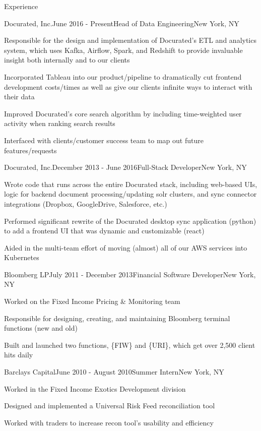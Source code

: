 \documentclass{resume}
\begin{document}
\begin{rSection}{Experience}
  \begin{rSubsection}{Docurated, Inc.}{June 2016 - Present}{Head of Data Engineering}{New York, NY}
  \item Responsible for the design and implementation of Docurated's ETL and analytics system,
    which uses Kafka, Airflow, Spark, and Redshift to provide invaluable 
    insight both internally and to our clients
  \item Incorporated Tableau into our product/pipeline to dramatically cut frontend development costs/times
    as well as give our clients infinite ways to interact with their data 
  \item Improved Docurated's core search algorithm by including time-weighted user activity when ranking search results
  \item Interfaced with clients/customer success team to map out future features/requests
  \end{rSubsection}

  \begin{rSubsection}{Docurated, Inc.}{December 2013 - June 2016}{Full-Stack Developer}{New York, NY}
  \item Wrote code that runs across the entire Docurated stack, including
    web-based UIs, logic for backend document processing/updating solr clusters, and
    sync connector integrations (Dropbox, GoogleDrive, Salesforce, etc.)
  \item Performed significant rewrite of the Docurated desktop sync application (python) 
    to add a frontend UI that was dynamic and customizable (react)
  \item Aided in the multi-team effort of moving (almost) all of our AWS services into Kubernetes
  \end{rSubsection}

  \begin{rSubsection}{Bloomberg LP}{July 2011 - December 2013}{Financial Software Developer}{New York, NY}
  \item Worked on the Fixed Income Pricing \& Monitoring team
  \item Responsible for designing, creating, and maintaining Bloomberg terminal functions (new and old)
  \item Built and launched two functions, \{FIW\} and \{URI\}, which get over 2,500 client hits daily
  \end{rSubsection}

  \begin{rSubsection}{Barclays Capital}{June 2010 - August 2010}{Summer Intern}{New York, NY}
  \item Worked in the Fixed Income Exotics Development division
  \item Designed and implemented a Universal Risk Feed reconciliation tool
  \item Worked with traders to increase recon tool's usability and efficiency
  \end{rSubsection}
\end{rSection}
\end{document}
